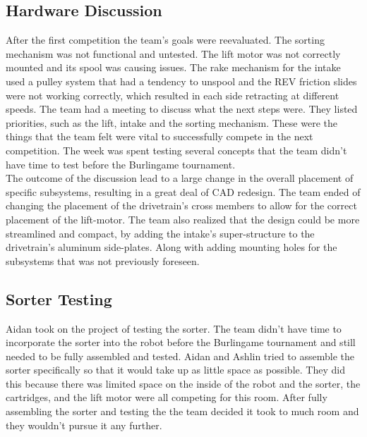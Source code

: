 \documentclass{article}
\begin{document}
\subsection{Hardware Discussion}
After the first competition the team's goals were reevaluated. The sorting mechanism was not functional and untested. The lift motor was not correctly mounted and its spool was causing issues. The rake mechanism for the intake used a pulley system that had a tendency to unspool and the REV friction slides were not working correctly, which resulted in each side retracting at different speeds. The team had a meeting to discuss what the next steps were. They listed priorities, such as the lift, intake and the sorting mechanism. These were the things that the team felt were vital to successfully compete in the next competition. The week was spent testing several concepts that the team didn't have time to test before the Burlingame tournament. \\

The outcome of the discussion lead to a large change in the overall placement of specific subsystems, resulting in a great deal of CAD redesign. The team ended of changing the placement of the drivetrain's cross members to allow for the correct placement of the lift-motor. The team also realized that the design could be more streamlined and compact, by adding the intake's super-structure to the drivetrain's aluminum side-plates. Along with adding mounting holes for the subsystems that was not previously foreseen.  \\


\subsection{Sorter Testing}
Aidan took on the project of testing the sorter. The team didn't have time to incorporate the sorter into the robot before the Burlingame tournament and still needed to be fully assembled and tested. Aidan and Ashlin tried to assemble the sorter specifically so that it would take up as little space as possible. They did this because there was limited space on the inside of the robot and the sorter, the cartridges, and the lift motor were all competing for this room. After fully assembling the sorter and testing the the team decided it took to much room and they wouldn't pursue it any further.
\end{document}
